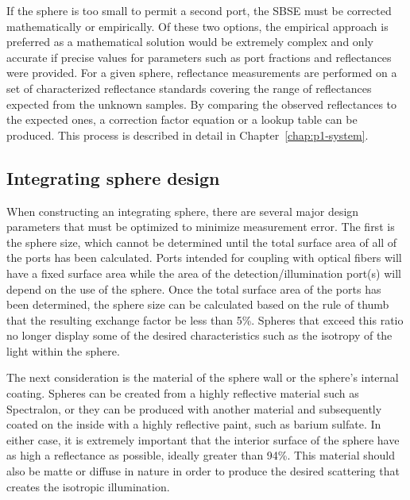 If the sphere is too small to permit a second port, the SBSE must be corrected mathematically or empirically. Of these two options, the empirical approach is preferred as a mathematical solution would be extremely complex and only accurate if precise values for parameters such as port fractions and reflectances were provided. For a given sphere, reflectance measurements are performed on a set of characterized reflectance standards covering the range of reflectances expected from the unknown samples. By comparing the observed reflectances to the expected ones, a correction factor equation or a lookup table can be produced. This process is described in detail in Chapter~\ref{chap:p1-system}.

\subsection{Integrating sphere design}
When constructing an integrating sphere, there are several major design parameters that must be optimized to minimize measurement error. The first is the sphere size, which cannot be determined until the total surface area of all of the ports has been calculated. Ports intended for coupling with optical fibers will have a fixed surface area while the area of the detection/illumination port(s) will depend on the use of the sphere. Once the total surface area of the ports has been determined, the sphere size can be calculated based on the rule of thumb that the resulting exchange factor be less than 5\%.\cite{Labsphereb} Spheres that exceed this ratio no longer display some of the desired characteristics such as the isotropy of the light within the sphere.

The next consideration is the material of the sphere wall or the sphere's internal coating. Spheres can be created from a highly reflective material such as Spectralon\textregistered, or they can be produced with another material and subsequently coated on the inside with a highly reflective paint, such as barium sulfate. In either case, it is extremely important that the interior surface of the sphere have as high a reflectance as possible, ideally greater than 94\%. This material should also be matte or diffuse in nature in order to produce the desired scattering that creates the isotropic illumination.

